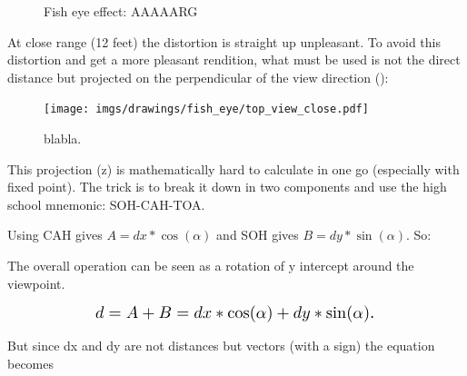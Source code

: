  \begin{figure}[H]
\centering
 \caption{Fish eye effect: AAAAARG} \label{fig:mips}
 \end{figure}
 

\begin{minipage}{.5\textwidth}
At close range (12 feet) the distortion is straight up unpleasant. To avoid this distortion and get a more pleasant rendition, what must be used is not the direct distance  but  projected on the perpendicular of the view direction ():
 \end{minipage}
\begin{minipage}{.5\textwidth}
 \begin{figure}[H]
  \begin{flushright}
  \texttt{[image: imgs/drawings/fish\_eye/top\_view\_close.pdf]}
 \end{flushright}
\end{figure}
 \end{minipage}

\par



\begin{figure}[H]

 
 \caption{blabla.} \label{fig:Raycasting2}
 
\end{figure}

This projection (z) is mathematically hard to calculate in one go (especially with fixed point). The trick is to break it down in two components and use the high school mnemonic: SOH-CAH-TOA.\\


\begin{figure}[H]
\centering
 
 
\end{figure}
Using CAH gives $A = dx * \cos(\alpha)$ and SOH gives $B = dy * \sin(\alpha) $. So:



The overall operation can be seen as a rotation of y intercept around the viewpoint.
\par
\begin{figure}[H]
  \centering
  \begin{equation*}
    \scalebox{1.3}{
$d = A + B = dx * \cos(\alpha) + dy * \sin(\alpha) $. 
 }
  \end{equation*}
\end{figure}
But since dx and dy are not distances but vectors (with a sign) the equation becomes 


